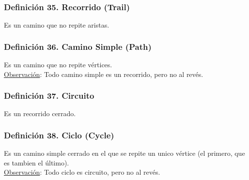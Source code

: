 \documentclass{article}
\begin{document}
\subsubsection*{Definición 35. Recorrido (Trail)}
Es un camino que no repite aristas.

\subsubsection*{Definición 36. Camino Simple (Path)}
Es un camino que no repite vértices.
\\\underline{Observación}: Todo camino simple es un recorrido, pero no al revés.

\subsubsection*{Definición 37. Circuito}
Es un recorrido cerrado.

\subsubsection*{Definición 38. Ciclo (Cycle)}
Es un camino simple cerrado en el que se repite un unico vértice (el primero, que es tambien el último).
\\\underline{Observación}: Todo ciclo es circuito, pero no al revés.
\end{document}
